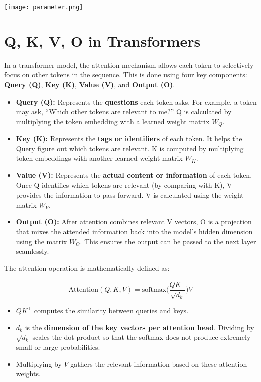 \texttt{[image: parameter.png]}
\newpage
\section{Q, K, V, O in Transformers}

In a transformer model, the attention mechanism allows each token to selectively focus on other tokens in the sequence. This is done using four key components: \textbf{Query (Q)}, \textbf{Key (K)}, \textbf{Value (V)}, and \textbf{Output (O)}.  

\begin{itemize}
    \item \textbf{Query (Q):} Represents the \textbf{questions} each token asks. For example, a token may ask, ``Which other tokens are relevant to me?'' Q is calculated by multiplying the token embedding with a learned weight matrix $W_Q$.
    
    \item \textbf{Key (K):} Represents the \textbf{tags or identifiers} of each token. It helps the Query figure out which tokens are relevant. K is computed by multiplying token embeddings with another learned weight matrix $W_K$.
    
    \item \textbf{Value (V):} Represents the \textbf{actual content or information} of each token. Once Q identifies which tokens are relevant (by comparing with K), V provides the information to pass forward. V is calculated using the weight matrix $W_V$.
    
    \item \textbf{Output (O):} After attention combines relevant V vectors, O is a projection that mixes the attended information back into the model’s hidden dimension using the matrix $W_O$. This ensures the output can be passed to the next layer seamlessly.
\end{itemize}

The attention operation is mathematically defined as:

\[
\text{Attention}(Q,K,V) = \text{softmax}\Big(\frac{QK^\top}{\sqrt{d_k}}\Big)V
\]

\begin{itemize}
    \item $QK^\top$ computes the similarity between queries and keys.  
    \item $d_k$ is the \textbf{dimension of the key vectors per attention head}. Dividing by $\sqrt{d_k}$ scales the dot product so that the softmax does not produce extremely small or large probabilities.  
    \item Multiplying by $V$ gathers the relevant information based on these attention weights.
\end{itemize}

